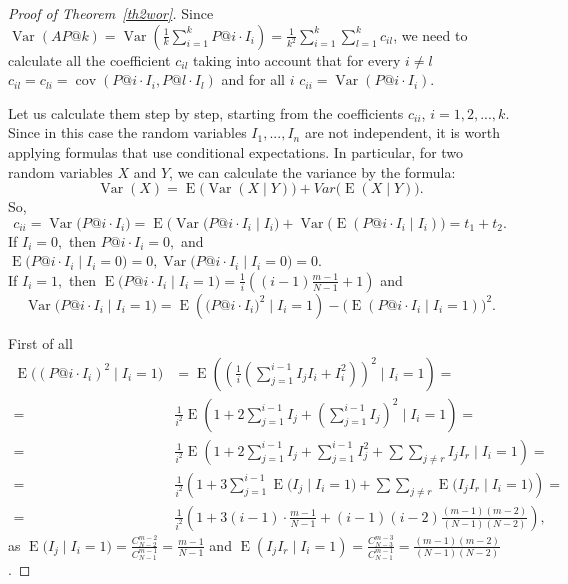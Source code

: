 \documentclass{tpms-l}
\theoremstyle{definition}
\theoremstyle{remark}
\numberwithin{equation}{section}
\begin{document}
\begin{proof}[Proof of Theorem~\ref {th2wor}]
Since $\operatorname{Var}(AP@k) = \operatorname{Var}\left(\frac{1}{k} \sum_{i=1}^k P@i \cdot I_i\right) = \frac{1}{k^2} \sum_{i=1}^k \sum_{l=1}^k c_{il}$, we need to calculate  all  the coefficient $c_{il}$ taking into account that
 for every $i\neq l$
$c_{il} = c_{li} = \operatorname{cov}(P@i \cdot I_i, P@l \cdot I_l)$
and  for all $i$
$c_{ii} = \operatorname{Var}(P@i \cdot I_i)$.

Let us calculate them step by step, starting from the coefficients $c_{ii}$, $i=1,2,...,k.$ Since in this case the random variables $I_1,..., I_n$ are not independent, it is worth applying formulas that use conditional expectations. In particular, for two random variables $X$ and $Y$, we can calculate the variance by the formula:
$$\operatorname{Var}(X)=\operatorname{E}\big(\operatorname{Var}(X\mid Y)\big)+Var\big(\operatorname{E}(X\mid Y)\big).$$
So,
\begin{equation}\label{t1t2}
c_{ii}=\operatorname{Var}\big(P@i\cdot I_i\big)=\operatorname{E}\big(\operatorname{Var}(P@i\cdot I_i\mid I_i\big)+\operatorname{Var} \big(\operatorname{E}(P@i\cdot I_i\mid I_i) \big)=t_1+t_2.
\end{equation}
If $I_i=0,$ then $P@i\cdot I_i=0,$ and $\operatorname{E}\big(P@i\cdot I_i\mid I_i=0\big)=0, \operatorname{Var}\big(P@i\cdot I_i\mid I_i=0\big)=0.$ \\
If $I_i=1,$ then $\operatorname{E}\big(P@i\cdot I_i\mid I_i=1\big)=\frac{1}{i} \left((i-1)\frac{m-1}{N-1}+1 \right)$ and 
$$\operatorname{Var}\big(P@i\cdot I_i\mid I_i=1\big)=\operatorname{E}\left(\big(P@i\cdot I_i\big)^2\mid I_i=1\right)-\big(\operatorname{E}(P@i\cdot I_i\mid I_i=1)\big)^2.$$

First of all
\begin{equation*}
\begin{split}
\operatorname{E}\big((P@i\cdot I_i)^2\mid I_i=1\big)&=\operatorname{E}\left(\left(\frac{1}{i}\left(\sum_{j=1}^{i-1} I_jI_i+I_i^2\right)\right)^2\mid I_i=1\right)=\\
=&\frac{1}{i^2}\operatorname{E}\left(1+2\sum_{j=1}^{i-1} I_j
+\left(\sum_{j=1}^{i-1} I_j\right)^2\mid I_i=1\right)=\\
=&\frac{1}{i^2}\operatorname{E}\left(1+2\sum_{j=1}^{i-1} I_j
+\sum_{j=1}^{i-1} I_j^2+\sum \sum_{j\neq r}I_j I_r\mid I_i=1\right)=\\
=&\frac{1}{i^2}\left(1+3\sum_{j=1}^{i-1} \operatorname{E}\big(I_j \mid I_i=1\big)+
\sum \sum_{j\neq r}\operatorname{E}\big(I_j I_r\mid I_i=1\big)\right)=\\
=&\frac{1}{i^2}\left(1+3(i-1)\cdot \frac{m-1}{N-1}+
(i-1)(i-2)\frac{(m-1)(m-2)}{(N-1)(N-2)}\right),
\end{split}
\end{equation*}
as $\operatorname{E}\big(I_j\mid I_i=1\big)=\frac{C_{N-2}^{m-2}}{C_{N-1}^{m-1}}=\frac{m-1}{N-1}$ and $\operatorname{E}(I_j I_r \mid I_i=1)=\frac{C_{N-3}^{m-3}}{C_{N-1}^{m-1}}=\frac{(m-1)(m-2)}{(N-1)(N-2)}$.


\end{proof}
\end{document}
